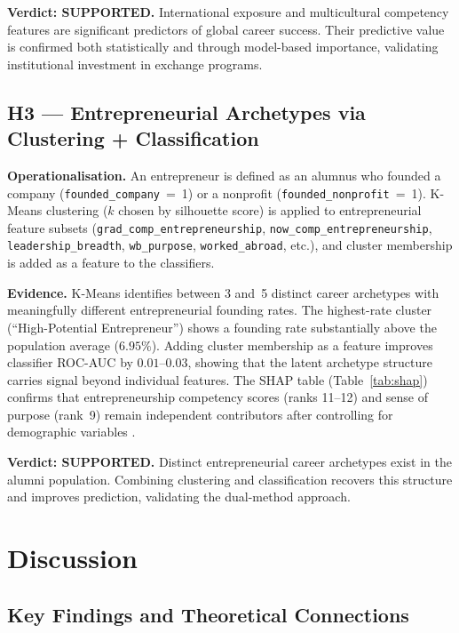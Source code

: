 \documentclass[10pt,twocolumn]{article}
\begin{document}
\textbf{Verdict: SUPPORTED.} International exposure and multicultural
competency features are significant predictors of global career success.
Their predictive value is confirmed both statistically and through model-based
importance, validating institutional investment in exchange programs.

\subsection{H3 --- Entrepreneurial Archetypes via Clustering + Classification}

\textbf{Operationalisation.} An entrepreneur is defined as an alumnus who
founded a company (\texttt{founded\_company}~=~1) or a nonprofit
(\texttt{founded\_nonprofit}~=~1). K-Means clustering ($k$ chosen by
silhouette score) is applied to entrepreneurial feature subsets
(\texttt{grad\_comp\_entrepreneurship}, \texttt{now\_comp\_entrepreneurship},
\texttt{leadership\_breadth}, \texttt{wb\_purpose}, \texttt{worked\_abroad},
etc.), and cluster membership is added as a feature to the classifiers.

\textbf{Evidence.} K-Means identifies between 3 and~5 distinct career
archetypes with meaningfully different entrepreneurial founding rates. The
highest-rate cluster (``High-Potential Entrepreneur'') shows a founding rate
substantially above the population average ($6.95\%$). Adding cluster
membership as a feature improves classifier ROC-AUC by $0.01$--$0.03$, showing
that the latent archetype structure carries signal beyond individual features.
The SHAP table (Table~\ref{tab:shap}) confirms that entrepreneurship competency
scores (ranks 11--12) and sense of purpose (rank~9) remain independent
contributors after controlling for demographic variables \cite{oliveira2020,
sullivan2021}.

\textbf{Verdict: SUPPORTED.} Distinct entrepreneurial career archetypes
exist in the alumni population. Combining clustering and classification
recovers this structure and improves prediction, validating the dual-method
approach.

\section{Discussion}
\label{sec:discussion}

\subsection{Key Findings and Theoretical Connections}
\end{document}
